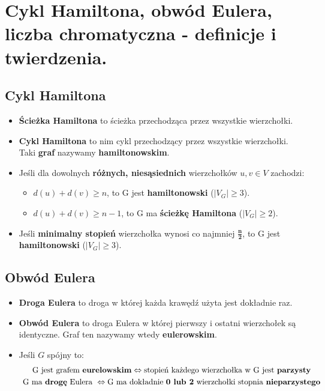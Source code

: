 \documentclass[main.tex]{subfiles}
\begin{document}
    \section{Cykl Hamiltona, obwód Eulera, liczba chromatyczna - definicje i twierdzenia.}

    \subsection{Cykl Hamiltona}
    \begin{itemize}
        \item \textbf{Ścieżka Hamiltona} to ścieżka przechodząca przez wszystkie wierzchołki.

        \item \textbf{Cykl Hamiltona} to nim cykl przechodzący przez wszystkie wierzchołki. Taki \textbf{graf}
        nazywamy \textbf{hamiltonowskim}.

        \item Jeśli dla dowolnych \textbf{różnych, niesąsiednich} wierzchołków $u, v \in V$ zachodzi:
        \begin{itemize}
            \item $d(u) + d(v) \geq n$, to G jest \textbf{hamiltonowski} ($|V_G| \geq 3$).
            \item $d(u) + d(v) \geq n-1$, to G ma \textbf{ścieżkę Hamiltona} ($|V_G| \geq 2$).
        \end{itemize}
        \item Jeśli \textbf{minimalny stopień} wierzchołka wynosi co najmniej $\mathbf{\frac{n}{2}}$, to G jest
        \textbf{hamiltonowski} ($|V_G| \geq 3$).
    \end{itemize}

    \subsection{Obwód Eulera}
    \begin{itemize}
        \item \textbf{Droga Eulera} to droga w której każda krawędź użyta jest dokładnie raz.

        \item \textbf{Obwód Eulera} to droga Eulera w której pierwszy i ostatni wierzchołek są identyczne.
        Graf ten nazywamy wtedy \textbf{eulerowskim}.

        \item Jeśli $G$ spójny to:
        \begin{gather*}
            \text{ G jest grafem \textbf{eurelowskim}} \Leftrightarrow \text{stopień każdego wierzchołka w G jest \textbf{parzysty}}\\
            \text{  G ma \textbf{drogę} Eulera } \Leftrightarrow \text {G ma dokładnie \textbf{0 lub 2} wierzchołki
            stopnia \textbf{nieparzystego}}
        \end{gather*}
    \end{itemize}
\end{document}
